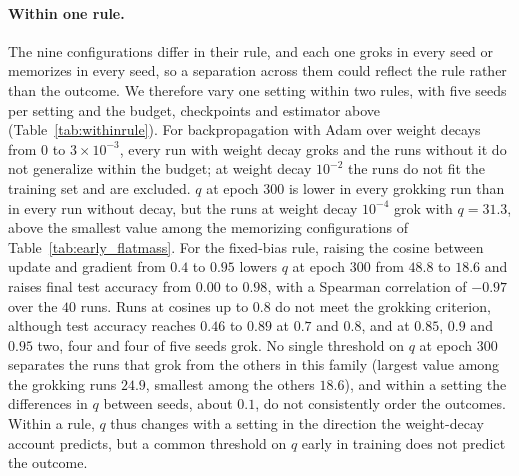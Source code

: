 \documentclass{article} %
\begin{document}
\paragraph{Within one rule.} The nine configurations differ in their rule, and each one groks in every seed or memorizes in every seed, so a separation across them could reflect the rule rather than the outcome. We therefore vary one setting within two rules, with five seeds per setting and the budget, checkpoints and estimator above (Table~\ref{tab:withinrule}). For backpropagation with Adam over weight decays from $0$ to $3\times10^{-3}$, every run with weight decay groks and the runs without it do not generalize within the budget; at weight decay $10^{-2}$ the runs do not fit the training set and are excluded. $q$ at epoch $300$ is lower in every grokking run than in every run without decay, but the runs at weight decay $10^{-4}$ grok with $q = 31.3$, above the smallest value among the memorizing configurations of Table~\ref{tab:early_flatmass}. For the fixed-bias rule, raising the cosine between update and gradient from $0.4$ to $0.95$ lowers $q$ at epoch $300$ from $48.8$ to $18.6$ and raises final test accuracy from $0.00$ to $0.98$, with a Spearman correlation of $-0.97$ over the $40$ runs. Runs at cosines up to $0.8$ do not meet the grokking criterion, although test accuracy reaches $0.46$ to $0.89$ at $0.7$ and $0.8$, and at $0.85$, $0.9$ and $0.95$ two, four and four of five seeds grok. No single threshold on $q$ at epoch $300$ separates the runs that grok from the others in this family (largest value among the grokking runs $24.9$, smallest among the others $18.6$), and within a setting the differences in $q$ between seeds, about $0.1$, do not consistently order the outcomes. Within a rule, $q$ thus changes with a setting in the direction the weight-decay account predicts, but a common threshold on $q$ early in training does not predict the outcome.
\end{document}
